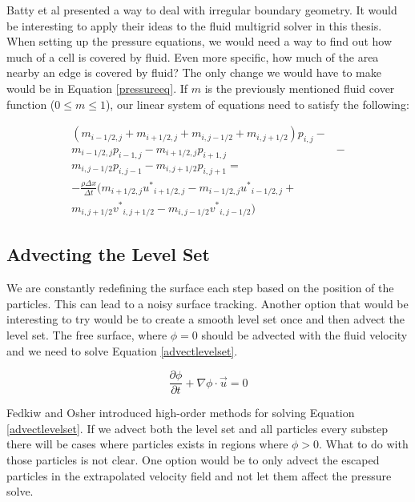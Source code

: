 Batty et al \cite{batty} presented a way to deal with irregular boundary geometry. It would be interesting to apply their ideas to the fluid multigrid solver in this thesis. When setting up the pressure equations, we would need a way to find out how much of a cell is covered by fluid. Even more specific, how much of the area nearby an edge is covered by fluid? The only change we would have to make would be in Equation \ref{pressureeq}. If $m$ is the previously mentioned fluid cover function ($0 \leq m \leq 1$), our linear system of equations need to satisfy the following:

\begin{equation}
\begin{split}
(m_{i-1/2,j} + m_{i+1/2,j} + m_{i,j-1/2} + m_{i,j+1/2})p_{i,j} - \\ 
m_{i-1/2,j} p_{i-1,j} - 
m_{i+1/2,j}p_{i+1,j} & - \\
m_{i,j-1/2}p_{i,j-1} - 
m_{i,j+1/2}p_{i,j+1} = \\ 
-\frac{\rho \Delta x}{\Delta t}(m_{i+1/2,j}{u^*}_{i+1/2,j} - m_{i-1/2,j}{u^*}_{i-1/2,j} + \\
m_{i,j+1/2}{v^*}_{i,j+1/2} - m_{i,j-1/2} {v^*}_{i,j-1/2})
\end{split}
\label{pressureeqvariational}
\end{equation}

\subsection{Advecting the Level Set}

We are constantly redefining the surface each step based on the position of the particles. This can lead to a noisy surface tracking. Another option that would be interesting to try would be to create a smooth level set once and then advect the level set. The free surface, where $\phi = 0$ should be advected with the fluid velocity and we need to solve Equation \ref{advectlevelset}.

\begin{equation}
\frac{\partial \phi}{\partial t} + \nabla \phi \cdot \vec{u} = 0
\label{advectlevelset}
\end{equation}

Fedkiw and Osher \cite{osher} introduced high-order methods for solving Equation \ref{advectlevelset}. If we advect both the level set and all particles every substep there will be cases where particles exists in regions where $\phi > 0$. What to do with those particles is not clear. One option would be to only advect the escaped particles in the extrapolated velocity field and not let them affect the pressure solve.

